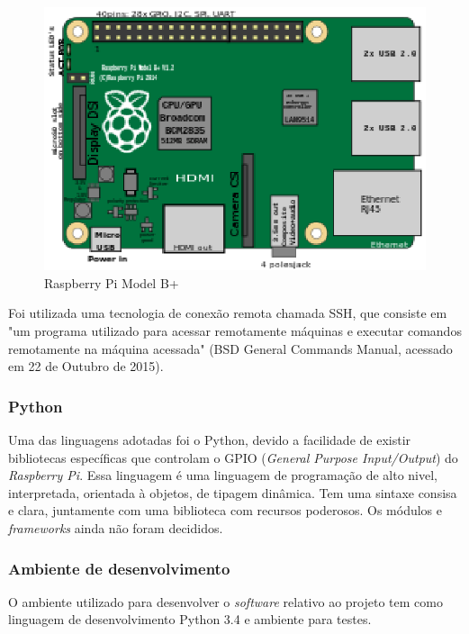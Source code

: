 \begin{figure}[!htb]
	\centering
	\includegraphics[keepaspectratio=true,scale=0.5]{figuras/referencialteorico/raspberry.eps}
	\caption{Raspberry Pi Model B+}
	\label{rasp}
\end{figure}

Foi utilizada uma tecnologia de conexão remota chamada SSH, que consiste em "um programa utilizado para acessar remotamente máquinas e executar comandos remotamente na máquina acessada" (BSD General Commands Manual, acessado em 22 de Outubro de 2015).

\subsubsection{Python}

Uma das linguagens adotadas foi o Python, devido a facilidade de existir bibliotecas específicas que controlam o GPIO (\textit{General Purpose Input/Output}) do \textit{Raspberry Pi}. Essa linguagem é uma linguagem de programação de alto nivel, interpretada, orientada à objetos, de tipagem dinâmica. Tem uma sintaxe consisa e clara, juntamente com uma biblioteca com recursos poderosos. Os módulos e \textit{frameworks} ainda não foram decididos.

\subsubsection{Ambiente de desenvolvimento}

O ambiente utilizado para desenvolver o \textit{software} relativo ao projeto tem como linguagem de desenvolvimento Python 3.4 e ambiente para testes.


